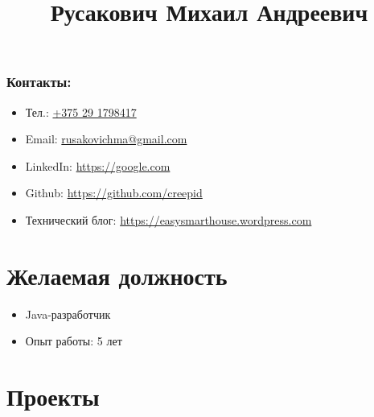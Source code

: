 \documentclass[a4paper, 12pt]{article}
\title{Русакович Михаил Андреевич}
\author{}
\date{}
\begin{document}
\maketitle

\subsubsection*{Контакты:}
\begin{itemize}
    \item Тел.: \href{tel:+375291798417}{+375 29 1798417}
    \item Email: \href{mailto:rusakovichma@gmail.com}{rusakovichma@gmail.com}
    \item LinkedIn: \href{https://google.com}{https://google.com}
    \item Github: \href{https://github.com/creepid}{https://github.com/creepid}
    \item Технический блог: \href{https://easysmarthouse.wordpress.com}{https://easysmarthouse.wordpress.com}
\end{itemize}


\section*{Желаемая должность}

    \begin{itemize}
        \item Java-разработчик
        \item Опыт работы: 5 лет
    \end{itemize}


\section*{Проекты}
\end{document}
